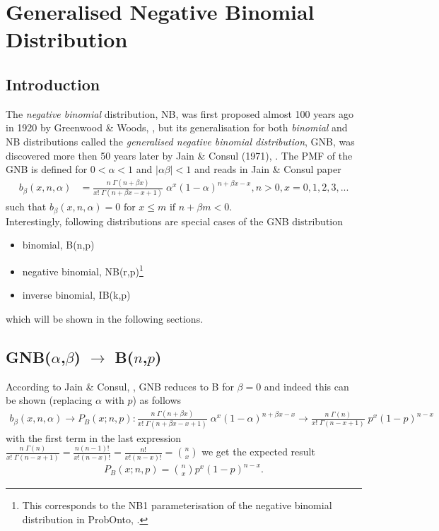 \section{Generalised Negative Binomial Distribution}
\subsection*{Introduction}
The \emph{negative binomial} distribution, NB, was first proposed almost 
100 years ago in 1920 by Greenwood \& Woods, \cite{greenwood1920inquiry}, 
but its generalisation for both \emph{binomial} and NB distributions called the 
\emph{generalised negative binomial distribution}, GNB, was discovered 
more then 50 years later by Jain \& Consul (1971), \cite{jain1971generalized}. 
The PMF of the GNB is defined for $0<\alpha<1$ and $|\alpha \beta| < 1$ 
and reads in Jain \& Consul paper
\begin{align*}
b_{\beta}(x,n,\alpha) &= 
\frac{n \; \Gamma(n+\beta x)}{x! \;\Gamma(n + \beta x - x +1)}  \; \alpha^x (1-\alpha)^{n+\beta x-x}, n>0, x=0,1,2,3,...
\end{align*}
such that $b_{\beta}(x,n,\alpha) = 0 \text{ for } x \leq m \text{ if } n+\beta m < 0.$\\
Interestingly, following distributions are special cases of the GNB distribution
\begin{itemize}
\item 
binomial, B(n,p)
\item 
negative binomial, NB(r,p)\footnote{This corresponds to the NB1 parameterisation 
of the negative binomial distribution in ProbOnto, \cite{Swat:2015a}.}
\item 
inverse binomial, IB(k,p)
\end{itemize}
which will be shown in the following sections. 

\subsection*{GNB($\alpha$,$\beta$) $\rightarrow$ B($n$,$p$)}
According to Jain \& Consul, \cite{jain1971generalized}, GNB reduces to B for $\beta = 0$ and 
indeed this can be shown (replacing $\alpha$ with $p$) as follows
\begin{align*}
 b_{\beta}(x,n,\alpha) \rightarrow P_{B}(x;n,p): %
 \frac{n \; \Gamma(n+\beta x)}{x! \;\Gamma(n + \beta x - x +1)}  \; \alpha^x (1-\alpha)^{n+\beta x-x} \rightarrow 
\frac{n \; \Gamma(n)}{x! \;\Gamma(n - x +1)}  \; p^x (1-p	)^{n-x} 
\end{align*}
with the first term in the last expression $\frac{n \; \Gamma(n)}{x! \;\Gamma(n - x +1)} = \frac{n (n-1)!}{x! (n-x)!} 
= \frac{n!}{x!(n-x)!} = {n \choose x}$ we get the expected result
\begin{align*}
P_{B}(x;n,p) = {n \choose x} p^x (1-p)^{n-x}. %
\end{align*}


